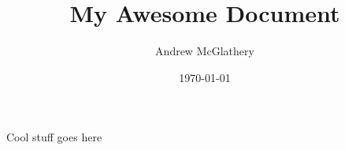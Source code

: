 \documentclass[12pt]{article}
\title{My Awesome Document}
\author{Andrew McGlathery}
\date{\today}
\begin{document}
  \maketitle
  Cool stuff goes here\cite{wallach2006topic}
  
  
\end{document}
